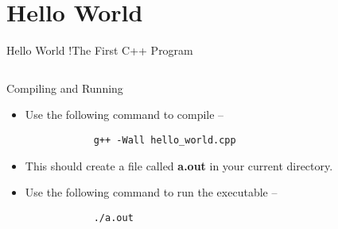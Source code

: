 \section{Hello World}

\begin{frame}{Hello World !}{The First C++ Program}
  \inputminted{c++}{../code/hello_world/hello_world.cpp}
\end{frame}

\begin{frame}[fragile]{Compiling and Running}
  \begin{itemize}
      \item Use the following command to compile --
        \begin{verbatim}
            g++ -Wall hello_world.cpp
        \end{verbatim}
      \item This should create a file called \textbf{a.out} in your current directory.
      \item Use the following command to run the executable --
        \begin{verbatim}
            ./a.out
        \end{verbatim}
  \end{itemize}
\end{frame}